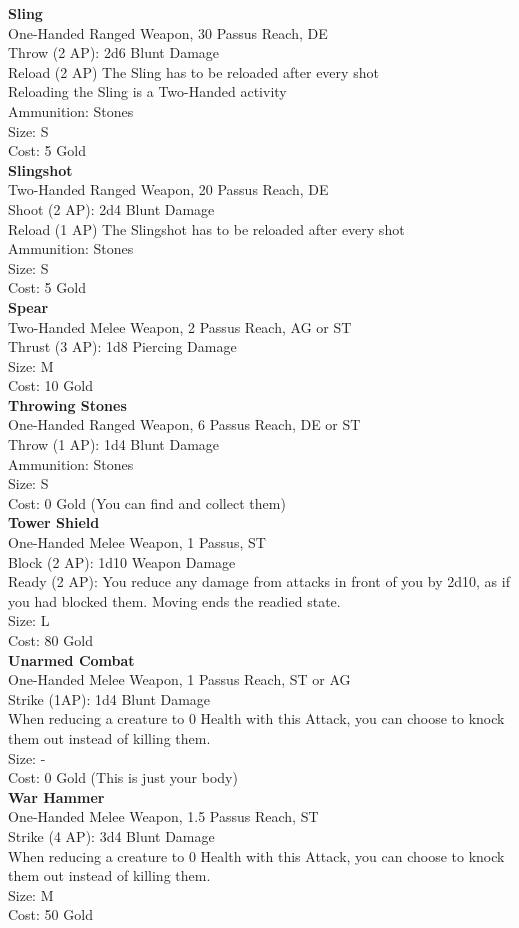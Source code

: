 \textbf{Sling}\\
One-Handed Ranged Weapon, 30 Passus Reach, DE\\
Throw (2 AP): 2d6 Blunt Damage\\
Reload (2 AP) The Sling has to be reloaded after every shot\\
Reloading the Sling is a Two-Handed activity\\
Ammunition: Stones\\
Size: S\\
Cost: 5 Gold\\


\textbf{Slingshot}\\
Two-Handed Ranged Weapon, 20 Passus Reach, DE\\
Shoot (2 AP): 2d4 Blunt Damage\\
Reload (1 AP) The Slingshot has to be reloaded after every shot\\
Ammunition: Stones\\
Size: S\\
Cost: 5 Gold\\


\textbf{Spear}\\
Two-Handed Melee Weapon, 2 Passus Reach, AG or ST\\
Thrust (3 AP): 1d8 Piercing Damage\\
Size: M\\
Cost: 10 Gold\\


\textbf{Throwing Stones}\\
One-Handed Ranged Weapon, 6 Passus Reach, DE or ST\\
Throw (1 AP): 1d4 Blunt Damage\\
Ammunition: Stones\\
Size: S\\
Cost: 0 Gold (You can find and collect them)\\


\textbf{Tower Shield}\\
One-Handed Melee Weapon, 1 Passus, ST\\
Block (2 AP): 1d10 Weapon Damage\\
Ready (2 AP): You reduce any damage from attacks in front of you by 2d10, as if you had blocked them. Moving ends the readied state.\\
Size: L\\
Cost: 80 Gold\\


\textbf{Unarmed Combat}\\
One-Handed Melee Weapon, 1 Passus Reach, ST or AG\\
Strike (1AP): 1d4 Blunt Damage\\
When reducing a creature to 0 Health with this Attack, you can choose to knock them out instead of killing them.\\
Size: -\\
Cost: 0 Gold (This is just your body)\\


\textbf{War Hammer}\\
One-Handed Melee Weapon, 1.5 Passus Reach, ST\\
Strike (4 AP): 3d4 Blunt Damage\\
When reducing a creature to 0 Health with this Attack, you can choose to knock them out instead of killing them.\\
Size: M\\
Cost: 50 Gold\\